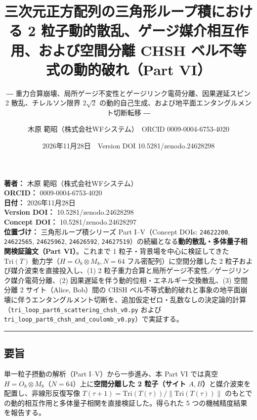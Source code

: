 \documentclass[
  a4paper,
]{ltjsarticle}
\title{三次元正方配列の三角形ループ積における 2
粒子動的散乱、ゲージ媒介相互作用、および空間分離 CHSH
ベル不等式の動的破れ（Part VI）}
\subtitle{―
重力合算崩壊、局所ゲージ不変性とゲージリンク電荷分離、因果遅延スピン 2
散乱、チレルソン限界 \(2\sqrt{2}\)
の動的自己生成、および地平面エンタングルメント切断転移 ―}
\author{木原 範昭（株式会社WFシステム）　ORCID 0009-0004-6753-4020}
\date{2026年11月28日　Version DOI 10.5281/zenodo.24628298}
\begin{document}
\maketitle

{
\setcounter{tocdepth}{2}
\tableofcontents
}
\textbf{著者：} 木原 範昭（株式会社WFシステム）\\
\textbf{ORCID：} 0009-0004-6753-4020\\
\textbf{日付：} 2026年11月28日\\
\textbf{Version DOI：} 10.5281/zenodo.24628298\\
\textbf{Concept DOI：} 10.5281/zenodo.24628297\\
\textbf{位置づけ：} 三角形ループ積シリーズ Part I--V（Concept DOIs:
\texttt{24622200}, \texttt{24622565}, \texttt{24625962},
\texttt{24626592},
\texttt{24627519}）の続編となる\textbf{動的散乱・多体量子相関検証論文（Part
VI）}。これまで 1 粒子・背景場を中心に検証してきた \(\mathrm{Tri}(T)\)
動力学（\(H = O_8 \otimes M_8, N = 64\) フル密配列）に空間分離した 2
粒子および媒介波束を直接投入し、(1) 2
粒子重力合算と局所ゲージ不変性／ゲージリンク媒介電荷分離、(2)
因果遅延を伴う動的位相・エネルギー交換散乱、(3) 空間分離 2
サイト（Alice, Bob）間の CHSH
ベル不等式動的破れと事象の地平面崩壊に伴うエンタングルメント切断を、追加仮定ゼロ・乱数なしの決定論的計算（\texttt{tri\_loop\_part6\_scattering\_chsh\_v0.py}
および
\texttt{tri\_loop\_part6\_chsh\_and\_coulomb\_v0.py}）で実証する。

\begin{center}\rule{0.5\linewidth}{0.5pt}\end{center}

\subsection{要旨}\label{ux8981ux65e8}

単一粒子摂動の解析（Part I--V）から一歩進み、本 Part VI では真空
\(H = O_8 \otimes M_8\)（\(N = 64\)）上に\textbf{空間分離した 2
粒子（サイト \(A, B\)）}と媒介波束を配置し、非線形反復写像
\(T(\tau+1) = \mathrm{Tri}(T(\tau)) / \|\mathrm{Tri}(T(\tau))\|\)
のもとでの動的相互作用と多体量子相関を直接検証した。得られた 5
つの機械精度結果を報告する。
\end{document}

